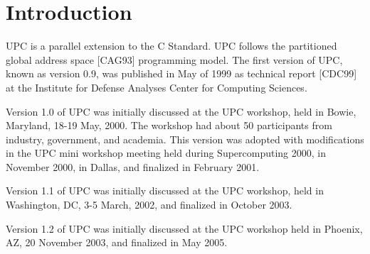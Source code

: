 \section*{Introduction}

\npf UPC is a parallel extension to the C Standard.  UPC follows the
    partitioned global address space [CAG93] programming model.
    The first version
    of UPC, known as version 0.9, was published in May of 1999 as
    technical report [CDC99] at the Institute for Defense Analyses
    Center for Computing Sciences.

\np Version 1.0 of UPC was initially discussed at the
    UPC workshop, held in Bowie, Maryland, 18-19 May, 2000.  The
    workshop had about 50 participants from industry, government, and
    academia. This version was adopted with modifications in the UPC
    mini workshop meeting held during Supercomputing 2000, in November
    2000, in Dallas, and finalized in February 2001.

\np Version 1.1 of UPC was initially discussed at the UPC
    workshop, held in Washington, DC, 3-5 March, 2002, and finalized
    in October 2003.
    
\np Version 1.2 of UPC was initially discussed at the UPC
   workshop held in Phoenix, AZ, 20 November 2003, and finalized
   in May 2005.
